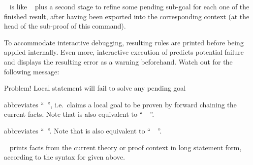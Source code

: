 \begin{isabellebody}
\begin{isamarkuptext}
\begin{description}
  \item \hyperlink{command.show}{\mbox{}}~ is like \hyperlink{command.have}{\mbox{}}~ plus a second stage to refine some pending
  sub-goal for each one of the finished result, after having been
  exported into the corresponding context (at the head of the
  sub-proof of this \hyperlink{command.show}{\mbox{}} command).
  
  To accommodate interactive debugging, resulting rules are printed
  before being applied internally.  Even more, interactive execution
  of \hyperlink{command.show}{\mbox{}} predicts potential failure and displays the
  resulting error as a warning beforehand.  Watch out for the
  following message:

  \begin{ttbox}
  Problem! Local statement will fail to solve any pending goal
  \end{ttbox}
  
  \item \hyperlink{command.hence}{\mbox{}} abbreviates ``\hyperlink{command.then}{\mbox{}}~\hyperlink{command.have}{\mbox{}}'', i.e.\ claims a local goal to be proven by forward
  chaining the current facts.  Note that \hyperlink{command.hence}{\mbox{}} is also
  equivalent to ``\hyperlink{command.from}{\mbox{}}~~\hyperlink{command.have}{\mbox{}}''.
  
  \item \hyperlink{command.thus}{\mbox{}} abbreviates ``\hyperlink{command.then}{\mbox{}}~\hyperlink{command.show}{\mbox{}}''.  Note that \hyperlink{command.thus}{\mbox{}} is also equivalent to
  ``\hyperlink{command.from}{\mbox{}}~~\hyperlink{command.show}{\mbox{}}''.
  
  \item \hyperlink{command.print-statement}{\mbox{}}~ prints facts from the
  current theory or proof context in long statement form, according to
  the syntax for \hyperlink{command.lemma}{\mbox{}} given above.


\end{description}
\end{isamarkuptext}
\end{isabellebody}
